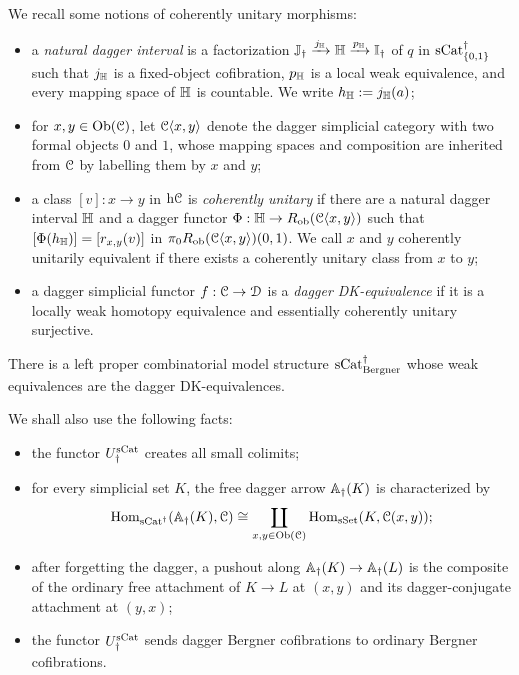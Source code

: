 \documentclass[a4paper,dvipdfmx,11pt]{amsart}
\begin{document}
\begin{definition}
  We recall some notions of coherently unitary morphisms:
  \begin{itemize}
    \item a \emph{natural dagger interval} is a factorization $\mathbb{J}_{\dag} \xrightarrow{j_{\mathbb{H}}} \mathbb{H} \xrightarrow{p_{\mathbb{H}}} \mathbb{I}_{\dag}$ of $q$ in $\mathrm{sCat}^{\dag}_{\{0,1\}}$ such that $j_{\mathbb{H}}$ is a fixed-object cofibration, $p_{\mathbb{H}}$ is a local weak equivalence, and every mapping space of $\mathbb{H}$ is countable.
    We write $h_{\mathbb{H}}:=j_{\mathbb{H}}(a)$;
    \item for $x,y\in\operatorname{Ob}(\mathcal{C})$, let $\mathcal{C}\langle x,y\rangle$ denote the dagger simplicial category with two formal objects $0$ and $1$, whose mapping spaces and composition are inherited from $\mathcal{C}$ by labelling them by $x$ and $y$;
    \item a class $[v]:x\to y$ in $\mathrm{h}\mathcal{C}$ is \emph{coherently unitary} if there are a natural dagger interval $\mathbb{H}$ and a dagger functor $\Phi:\mathbb{H} \to R_{\mathrm{ob}}(\mathcal{C}\langle x,y\rangle)$ such that $[\Phi(h_{\mathbb{H}})]=[r_{x,y}(v)]$ in $\pi_0R_{\mathrm{ob}}(\mathcal{C}\langle x,y\rangle)(0,1)$.
    We call $x$ and $y$ coherently unitarily equivalent if there exists a coherently unitary class from $x$ to $y$;
    \item a dagger simplicial functor $f:\mathcal{C}\to\mathcal{D}$ is a \emph{dagger DK-equivalence} if it is a locally weak homotopy equivalence and essentially coherently unitary surjective.
  \end{itemize}
\end{definition}

\begin{theorem}
  There is a left proper combinatorial model structure $\mathrm{sCat}^{\dag}_{\mathrm{Bergner}}$ whose weak equivalences are the dagger DK-equivalences.
\end{theorem}

\begin{proposition}
  We shall also use the following facts:
  \begin{itemize}
    \item the functor $U_{\dag}^{\mathrm{sCat}}$ creates all small colimits;
    \item for every simplicial set $K$, the free dagger arrow $\mathbb{A}_{\dag}(K)$ is characterized by
    \begin{align}
      \operatorname{Hom}_{\mathrm{sCat}^{\dag}}(\mathbb{A}_{\dag}(K),\mathcal{C})
      \cong
      \coprod_{x,y\in\operatorname{Ob}(\mathcal{C})}
      \operatorname{Hom}_{\mathrm{sSet}}(K,\mathcal{C}(x,y));
    \end{align}
    \item after forgetting the dagger, a pushout along $\mathbb{A}_{\dag}(K)\to\mathbb{A}_{\dag}(L)$ is the composite of the ordinary free attachment of $K\to L$ at $(x,y)$ and its dagger-conjugate attachment at $(y,x)$;
    \item the functor $U_{\dag}^{\mathrm{sCat}}$ sends dagger Bergner cofibrations to ordinary Bergner cofibrations.
  \end{itemize}
\end{proposition}
\end{document}
